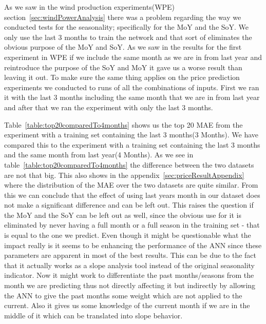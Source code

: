As we saw in the wind production experiments(WPE) section~\ref{sec:windPowerAnalysis} there was a problem regarding the way we conducted tests for the seasonality; specifically for the MoY and the SoY. We only use the last 3 months to train the network and that sort of eliminates the obvious purpose of the MoY and SoY. As we saw in the results for the first experiment in WPE if we include the same month as we are in from last year and reintroduce the purpose of the SoY and MoY it gave us a worse result than leaving it out. To make sure the same thing applies on the price prediction experiments we conducted to runs of all the combinations of inputs. First we ran it with the last 3 months including the same month that we are in from last year and after that we ran the experiment with only the last 3 months.

Table~\ref{table:top20comparedTo4months} shows us the top 20 MAE from the experiment with a training set containing the last 3 months(3 Months). We have compared this to the experiment with a training set containing the last 3 months and the same month from last year(4 Months). As we see in table~\ref{table:top20comparedTo4months} the difference between the two datasets are not that big. This also shows in the appendix~\ref{sec:priceResultAppendix} where the distribution of the MAE over the two datasets are quite similar. From this we can conclude that the effect of using last years month in our dataset does not make a significant difference and can be left out. This raises the question if the MoY and the SoY can be left out as well, since the obvious use for it is eliminated by never having a full month or a full season in the training set - that is equal to the one we predict. Even though it might be questionable what the impact really is it seems to be enhancing the performance of the ANN since these parameters are apparent in most of the best results. This can be due to the fact that it actually works as a slope analysis tool instead of the original seasonality indicator. Now it might work to differentiate the past months/seasons from the month we are predicting thus not directly affecting it but indirectly by allowing the ANN to give the past months some weight which are not applied to the current. Also it gives us some knowledge of the current month if we are in the middle of it which can be translated into slope behavior.

